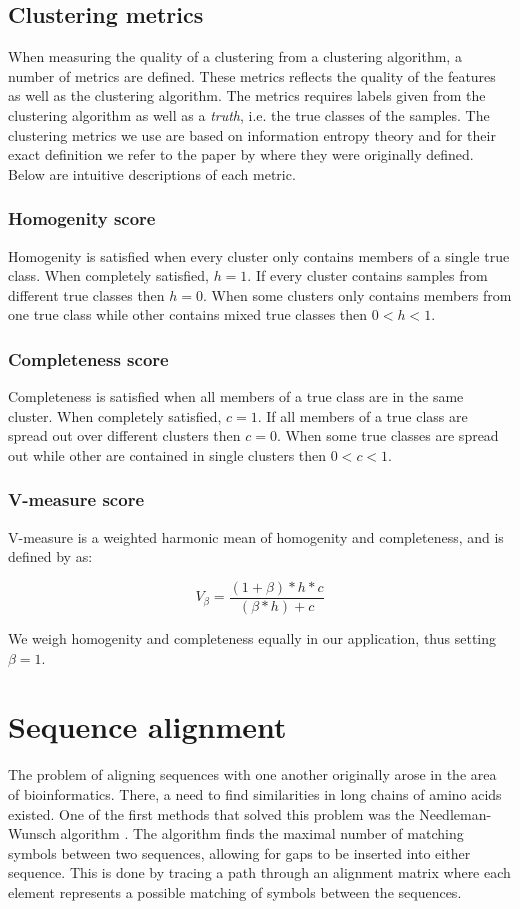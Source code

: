 \documentclass[a4paper]{report}
\begin{document}
\subsection{Clustering metrics}
\label{sec:metrics}
When measuring the quality of a clustering from a clustering algorithm, a
number of metrics are defined. These metrics reflects the quality of the
features as well as the clustering algorithm. The metrics requires labels
given from the clustering algorithm as well as a \emph{truth}, i.e. the true
classes of the samples. The clustering metrics we use are based on information
entropy theory and for their exact definition we refer to the paper by
\citet{rosenberg07} where they were originally defined. Below are intuitive
descriptions of each metric.

\subsubsection{Homogenity score}
Homogenity is satisfied when every cluster only contains members of a single
true class. When completely satisfied, $h = 1$. If every cluster contains
samples from different true classes then $h = 0$. When some clusters only
contains members from one true class while other contains mixed true classes
then $0 < h < 1$.

\subsubsection{Completeness score}
Completeness is satisfied when all members of a true class are in the same
cluster. When completely satisfied, $c = 1$. If all members of a true class
are spread out over different clusters then $c = 0$. When some true classes
are spread out while other are contained in single clusters then
$0 < c < 1$.

\subsubsection{V-measure score}
V-measure is a weighted harmonic mean of homogenity and completeness, and
is defined by \citeauthor{rosenberg07} as:

\[
    V_{\beta} = \frac{(1 + \beta) * h * c}{(\beta * h) + c}
\]

We weigh homogenity and completeness equally in our application, thus setting
$\beta = 1$.

\section{Sequence alignment}
The problem of aligning sequences with one another originally arose in the area
of bioinformatics. There, a need to find similarities in long chains of amino
acids existed. One of the first methods that solved this problem was the
Needleman-Wunsch algorithm \citep{needleman70}. The algorithm finds the maximal
number of matching symbols between two sequences, allowing for gaps to be
inserted into either sequence. This is done by tracing a path through an
alignment matrix where each element represents a possible matching of symbols
between the sequences.
\end{document}
